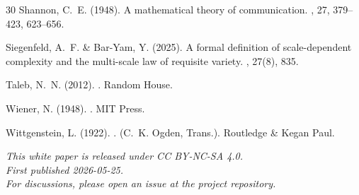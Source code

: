 \documentclass[11pt,a4paper]{article}
\begin{document}
\begin{thebibliography}{30}
Shannon, C.~E. (1948).
\newblock A mathematical theory of communication.
, 27, 379--423, 623--656.

Siegenfeld, A.~F. \& Bar-Yam, Y. (2025).
\newblock A formal definition of scale-dependent complexity and the multi-scale law of requisite variety.
, 27(8), 835.

Taleb, N.~N. (2012).
.
\newblock Random House.

Wiener, N. (1948).
.
\newblock MIT Press.

Wittgenstein, L. (1922).
.
\newblock (C.~K. Ogden, Trans.). Routledge \& Kegan Paul.

\end{thebibliography}

\vspace{1cm}

\begin{center}
\textit{This white paper is released under CC BY-NC-SA 4.0.}\\
\textit{First published 2026-05-25.}\\
\textit{For discussions, please open an issue at the project repository.}
\end{center}
\end{document}
